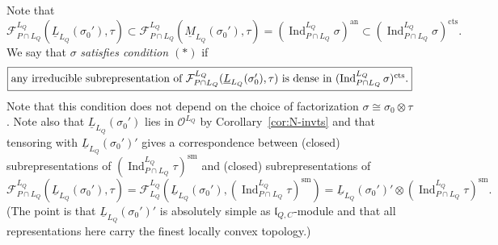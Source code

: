 \documentclass[a4paper]{amsart}
\numberwithin{equation}{section}
\theoremstyle{remark}
\theoremstyle{definition}
\DeclareMathOperator{\Ind}{Ind}
\newcommand{\sm}{\mathrm{sm}}
\newcommand{\an}{\mathrm{an}}
\newcommand{\cts}{\mathrm{cts}}
\begin{document}
Note that
\begin{equation*}
  \mathcal{F}_{P \cap L_Q}^{L_Q} (\underline{L}_{L_Q}(\sigma_0'),\tau) \subset \mathcal{F}_{P \cap L_Q}^{L_Q} (\underline{M}_{L_Q}(\sigma_0'),\tau) = (\Ind_{P \cap L_Q}^{L_Q} \sigma)^{\an} \subset (\Ind_{P \cap L_Q}^{L_Q} \sigma)^{\cts}.
\end{equation*}
We say that $\sigma$ \emph{satisfies condition $(\ast)$} if 
\begin{equation*}
\fbox{\text{any irreducible subrepresentation of $\mathcal{F}_{P \cap L_Q}^{L_Q} (\underline{L}_{L_Q}(\sigma_0'),\tau)$ is dense in $(\Ind_{P \cap L_Q}^{L_Q} \sigma)^{\cts}$.}}
\end{equation*}
Note that this condition does not depend on the choice of factorization $\sigma \cong \sigma_0\otimes \tau$.
Note also that $\underline{L}_{L_Q}(\sigma_0')$ lies in $\mathcal{O}^{L_Q}$ by Corollary~\ref{cor:N-invts} and that
tensoring with $\underline{L}_{L_Q}(\sigma_0')'$ gives a correspondence between (closed) subrepresentations of $(\Ind_{P \cap L_Q}^{L_Q} \tau)^{\sm}$
and (closed) subrepresentations of 
\begin{equation*}
\mathcal{F}_{P \cap L_Q}^{L_Q} (\underline{L}_{L_Q}(\sigma_0'),\tau) = \mathcal{F}_{L_Q}^{L_Q} (\underline{L}_{L_Q}(\sigma_0'),(\Ind_{P \cap L_Q}^{L_Q} \tau)^{\sm}) = \underline{L}_{L_Q}(\sigma_0')' \otimes (\Ind_{P \cap L_Q}^{L_Q} \tau)^{\sm}.
\end{equation*}
(The point is that $\underline{L}_{L_Q}(\sigma_0')'$ is absolutely simple as $\mathfrak{l}_{Q,C}$-module and that all representations here carry the finest locally convex topology.)
\end{document}
